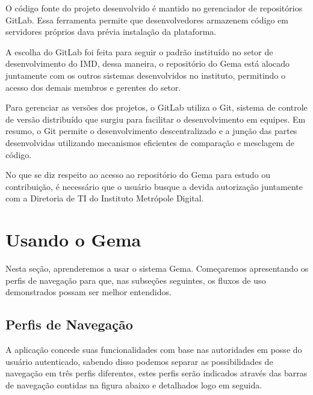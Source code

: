 O código fonte do projeto desenvolvido é mantido no gerenciador de repositórios GitLab. Essa ferramenta permite que desenvolvedores armazenem código em servidores próprios dava prévia instalação da plataforma. 

A escolha do GitLab foi feita para seguir o padrão instituído no setor de desenvolvimento do IMD, dessa maneira, o repositório do Gema está alocado juntamente com os outros sistemas desenvolvidos no instituto, permitindo o acesso dos demais membros e gerentes do setor.

Para gerenciar as versões dos projetos, o GitLab utiliza o Git, sistema de controle de versão distribuído que surgiu para facilitar o desenvolvimento em equipes. Em resumo, o Git permite o desenvolvimento descentralizado e a junção das partes desenvolvidas utilizando mecanismos eficientes de comparação e mesclagem de código.

No que se diz respeito ao acesso ao repositório do Gema para estudo ou contribuição, é necessário que o usuário busque a devida autorização juntamente com a Diretoria de TI do Instituto Metrópole Digital.

\section{Usando o Gema}

Nesta seção, aprenderemos a usar o sistema Gema. Começaremos apresentando os perfis de navegação para que, nas subseções seguintes, os fluxos de uso demonstrados possam ser melhor entendidos. 

\subsection{Perfis de Navegação}\label{nav_perfis}

A aplicação concede suas funcionalidades com base nas autoridades em posse do usuário autenticado, sabendo disso podemos separar as possibilidades de navegação em três perfis diferentes, estes perfis serão indicados através das barras de navegação contidas na figura abaixo e detalhados logo em seguida.


